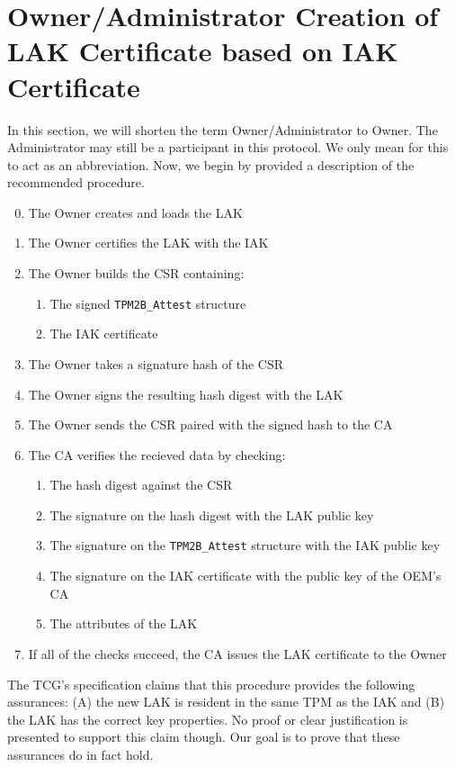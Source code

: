 \section{Owner/Administrator Creation of LAK Certificate based on IAK Certificate}
In this section, we will shorten the term Owner/Administrator to Owner. The Administrator may still be a participant in this protocol. We only mean for this to act as an abbreviation. Now, we begin by provided a description of the recommended procedure. 
\begin{enumerate}[itemsep=0pt,parsep=0pt,partopsep=0pt]
  \setcounter{enumi}{-1}
  \item The Owner creates and loads the LAK
  \item The Owner certifies the LAK with the IAK
  \item The Owner builds the CSR containing:
  \begin{enumerate}[topsep=0pt, itemsep=0pt,parsep=0pt,partopsep=0pt]
    \item The signed \verb|TPM2B_Attest| structure
    \item The IAK certificate
  \end{enumerate}
  \item The Owner takes a signature hash of the CSR
  \item The Owner signs the resulting hash digest with the LAK
  \item The Owner sends the CSR paired with the signed hash to the CA
  \item The CA verifies the recieved data by checking:
  \begin{enumerate}[topsep=0pt, itemsep=0pt,parsep=0pt,partopsep=0pt]
    \item The hash digest against the CSR
    \item The signature on the hash digest with the LAK public key
    \item The signature on the \verb|TPM2B_Attest| structure with the IAK public key
    \item The signature on the IAK certificate with the public key of the OEM's CA
    \item The attributes of the LAK
  \end{enumerate}
  \item If all of the checks succeed, the CA issues the LAK certificate to the Owner
\end{enumerate}
The TCG's specification claims that this procedure provides the following assurances: (A) the new LAK is resident in the same TPM as the IAK and (B) the LAK has the correct key properties. No proof or clear justification is presented to support this claim though. Our goal is to prove that these assurances do in fact hold. 

